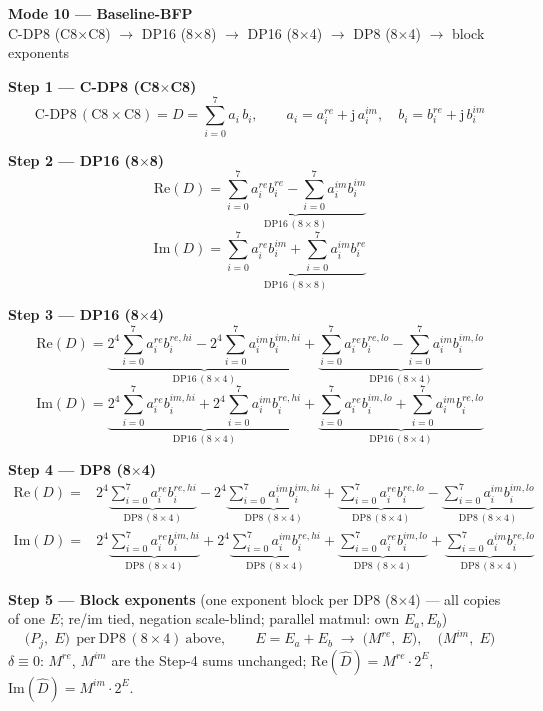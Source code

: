 \documentclass[fleqn]{article}
\newcommand{\DPop}[3]{\mathrm{DP#1}\,(#2\!\times\!#3)}
\begin{document}
\begin{center}
{\LARGE \textbf{Mode 10 --- Baseline-BFP}}\\[4pt]
{\large C-DP8 (C8$\times$C8) $\rightarrow$ DP16 (8$\times$8) $\rightarrow$ DP16 (8$\times$4) $\rightarrow$ DP8 (8$\times$4) $\rightarrow$ block exponents}
\end{center}

\vspace{0.3em}

\textbf{Step 1 --- C-DP8 (C8$\times$C8)}
\[
\text{C-DP8}\,(\mathrm{C8}\!\times\!\mathrm{C8}) = D = \sum_{i=0}^{7} a_i \, b_i, \qquad
a_i = a_i^{re} + \mathrm{j}\,a_i^{im}, \quad
b_i = b_i^{re} + \mathrm{j}\,b_i^{im}
\]

\textbf{Step 2 --- DP16 (8$\times$8)}
\[
\mathrm{Re}(D) = \underbrace{\sum_{i=0}^{7} a_i^{re} b_i^{re}
  - \sum_{i=0}^{7} a_i^{im} b_i^{im}}_{\DPop{16}{8}{8}}
\]
\[
\mathrm{Im}(D) = \underbrace{\sum_{i=0}^{7} a_i^{re} b_i^{im}
  + \sum_{i=0}^{7} a_i^{im} b_i^{re}}_{\DPop{16}{8}{8}}
\]

\textbf{Step 3 --- DP16 (8$\times$4)}
\[
\mathrm{Re}(D) = \underbrace{2^{4}\sum_{i=0}^{7} a_i^{re} b_i^{re,hi}
  - 2^{4}\sum_{i=0}^{7} a_i^{im} b_i^{im,hi}}_{\DPop{16}{8}{4}}
  + \underbrace{\sum_{i=0}^{7} a_i^{re} b_i^{re,lo}
  - \sum_{i=0}^{7} a_i^{im} b_i^{im,lo}}_{\DPop{16}{8}{4}}
\]
\[
\mathrm{Im}(D) = \underbrace{2^{4}\sum_{i=0}^{7} a_i^{re} b_i^{im,hi}
  + 2^{4}\sum_{i=0}^{7} a_i^{im} b_i^{re,hi}}_{\DPop{16}{8}{4}}
  + \underbrace{\sum_{i=0}^{7} a_i^{re} b_i^{im,lo}
  + \sum_{i=0}^{7} a_i^{im} b_i^{re,lo}}_{\DPop{16}{8}{4}}
\]

\textbf{Step 4 --- DP8 (8$\times$4)}
\begin{align*}
\mathrm{Re}(D) = {}
  & 2^{4} \underbrace{\sum_{i=0}^{7} a_i^{re} b_i^{re,hi}}_{\DPop{8}{8}{4}}
  - 2^{4} \underbrace{\sum_{i=0}^{7} a_i^{im} b_i^{im,hi}}_{\DPop{8}{8}{4}}
  + \underbrace{\sum_{i=0}^{7} a_i^{re} b_i^{re,lo}}_{\DPop{8}{8}{4}}
  - \underbrace{\sum_{i=0}^{7} a_i^{im} b_i^{im,lo}}_{\DPop{8}{8}{4}}
\end{align*}
\begin{align*}
\mathrm{Im}(D) = {}
  & 2^{4} \underbrace{\sum_{i=0}^{7} a_i^{re} b_i^{im,hi}}_{\DPop{8}{8}{4}}
  + 2^{4} \underbrace{\sum_{i=0}^{7} a_i^{im} b_i^{re,hi}}_{\DPop{8}{8}{4}}
  + \underbrace{\sum_{i=0}^{7} a_i^{re} b_i^{im,lo}}_{\DPop{8}{8}{4}}
  + \underbrace{\sum_{i=0}^{7} a_i^{im} b_i^{re,lo}}_{\DPop{8}{8}{4}}
\end{align*}

\textbf{Step 5 --- Block exponents}\quad
{\small(one exponent block per DP8 (8$\times$4) --- all copies of one $E$; re/im tied, negation scale-blind; parallel matmul: own $E_a,E_b$)}
\[
\big(P_j,\; E\big)\ \ \text{per}\ \DPop{8}{8}{4}\ \text{above}, \qquad E = E_a + E_b
\;\longrightarrow\;
\big(M^{re},\; E\big), \quad \big(M^{im},\; E\big)
\]
$\delta\equiv0$: $M^{re}$, $M^{im}$ are the Step-4 sums unchanged; \quad $\mathrm{Re}(\hat D)=M^{re}\cdot2^{E}$, \ $\mathrm{Im}(\hat D)=M^{im}\cdot2^{E}$.
\end{document}
